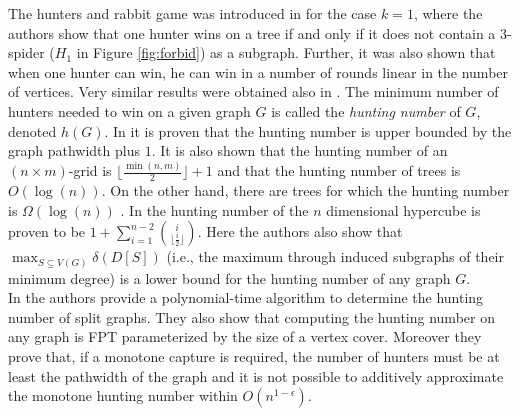 \documentclass[runningheads]{llncs}
\begin{document}
The hunters and rabbit game was introduced in \cite{journals/combinatorics/BritnellW13} for the case $k=1$, where the authors show that one hunter wins on a tree if and only if it does not contain a $3$-spider ($H_1$ in Figure \ref{fig:forbid}) as a subgraph. Further, it was also shown that when one hunter can win, he can win in a number of rounds linear in the number of vertices. Very similar results were obtained also in \cite{HASLEGRAVE20141}.
The minimum number of hunters needed to win on a given graph $G$ is called the \textit{hunting number} of $G$, denoted $h(G)$. In \cite{ABRAMOVSKAYA201612} it is proven that the hunting number is upper bounded by the graph pathwidth plus $1$. %
It is also shown that the hunting number of an $(n\times m)$-grid is $\lfloor \frac{\min(n,m)}{2}\rfloor+1$ and that the hunting number of trees is $O(\log (n))$. On the other hand, there are trees for which the hunting number is $\Omega(\log (n))$ \cite{gruslys2015catching}. In \cite{BOLKEMA2019360} the hunting number of the $n$ dimensional hypercube is proven to be $1+\sum_{i=1}^{n-2}\binom{i}{\lfloor \frac{i}{2} \rfloor}$. Here the authors also show that $\max_{S \subseteq V(G)} \delta(D[S])$ {(i.e., the maximum through induced subgraphs of their minimum degree)} is a lower bound for the hunting number of any graph $G$. \\
In \cite{dissaux:hal-03995642} the authors provide a polynomial-time algorithm to determine the hunting number of split graphs. They also show that computing the hunting number on any graph is FPT parameterized by the size of a vertex cover. Moreover they prove that, if a monotone capture is required, the number of hunters must be at least the pathwidth of the graph and it is not possible to additively approximate the monotone hunting number within $O(n^{1-\epsilon})$. 
\end{document}
